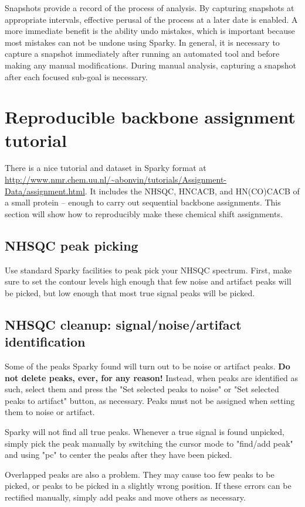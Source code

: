 Snapshots provide a record of the process of analysis.  By capturing snapshots
at appropriate intervals, effective perusal of the process at a later date is
enabled.  A more immediate benefit is the ability undo mistakes, which is 
important because most mistakes can not be undone using Sparky.
In general, it is necessary to capture a snapshot immediately after
running an automated tool and before making any manual modifications.  During
manual analysis, capturing a snapshot after each focused sub-goal is necessary.



\section{Reproducible backbone assignment tutorial}
There is a nice tutorial and dataset in Sparky format at 
\url{http://www.nmr.chem.uu.nl/~abonvin/tutorials/Assignment-Data/assignment.html}.
It includes the NHSQC, HNCACB, and HN(CO)CACB of a small protein -- enough
to carry out sequential backbone assignments.
This section will show how to reproducibly make these chemical shift
assignments.

\subsection{NHSQC peak picking}
Use standard Sparky facilities to peak pick your NHSQC spectrum.
First, make sure to set the contour levels high enough that few noise and 
artifact peaks will be picked, but low enough that most true signal peaks
will be picked.

\subsection{NHSQC cleanup: signal/noise/artifact identification}
Some of the peaks Sparky found will turn out to be noise or artifact peaks.
\textbf{Do not delete peaks, ever, for any reason!}  Instead,
when peaks are identified as such, select them and press the "Set selected 
peaks to noise" or "Set selected peaks to artifact" button, as necessary.
Peaks must not be assigned when setting them to noise or artifact.

Sparky will not find all true peaks.  Whenever a true signal is found 
unpicked, simply pick the peak manually by switching the cursor mode to 
"find/add peak" and using "pc" to center the peaks after they have been
picked.

Overlapped peaks are also a problem.  They may cause too few peaks to be 
picked, or peaks to be picked in a slightly wrong position.  If these errors
can be rectified manually, simply add peaks and move others as necessary.

